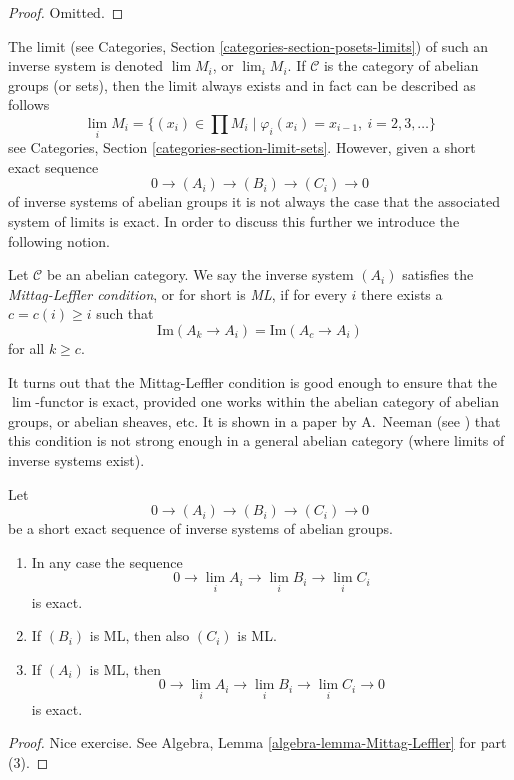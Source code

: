 \begin{proof}
Omitted.
\end{proof}

\noindent
The limit (see Categories, Section \ref{categories-section-posets-limits})
of such an inverse system is denoted $\lim M_i$, or $\lim_i M_i$.
If $\mathcal{C}$ is the category of abelian groups (or sets), then the limit
always exists and in fact can be described as follows
$$
\lim_i M_i
=
\{(x_i) \in \prod M_i \mid \varphi_i(x_i) = x_{i - 1}, \ i = 2, 3, \ldots\}
$$
see Categories, Section \ref{categories-section-limit-sets}.
However, given a short exact sequence
$$
0 \to (A_i) \to (B_i) \to (C_i) \to 0
$$
of inverse systems of abelian groups it is not always the case
that the associated system of limits is exact. In order to discuss
this further we introduce the following notion.

\begin{definition}
\label{definition-Mittag-Leffler}
Let $\mathcal{C}$ be an abelian category.
We say the inverse system $(A_i)$
satisfies the {\it Mittag-Leffler condition}, or for short
is {\it ML}, if for every $i$ there exists a $c = c(i) \geq i$
such that
$$
\text{Im}(A_k \to A_i) = \text{Im}(A_c \to A_i)
$$
for all $k \geq c$.
\end{definition}

\noindent
It turns out that the Mittag-Leffler condition is good enough to ensure
that the $\lim$-functor is exact, provided one works within
the abelian category of abelian groups, or abelian sheaves, etc.
It is shown in a paper by A.\ Neeman (see \cite{Neeman-Counterexample})
that this condition is not strong enough in a general abelian
category (where limits of inverse systems exist).

\begin{lemma}
\label{lemma-Mittag-Leffler}
Let
$$
0 \to (A_i) \to (B_i) \to (C_i) \to 0
$$
be a short exact sequence of inverse systems of abelian groups.
\begin{enumerate}
\item In any case the sequence
$$
0 \to \lim_i A_i \to \lim_i B_i \to \lim_i C_i
$$
is exact.
\item If $(B_i)$ is ML, then also $(C_i)$ is ML.
\item If $(A_i)$ is ML, then
$$
0 \to \lim_i A_i \to \lim_i B_i \to \lim_i C_i \to 0
$$
is exact.
\end{enumerate}
\end{lemma}

\begin{proof}
Nice exercise. See
Algebra, Lemma \ref{algebra-lemma-Mittag-Leffler} for part (3).
\end{proof}

